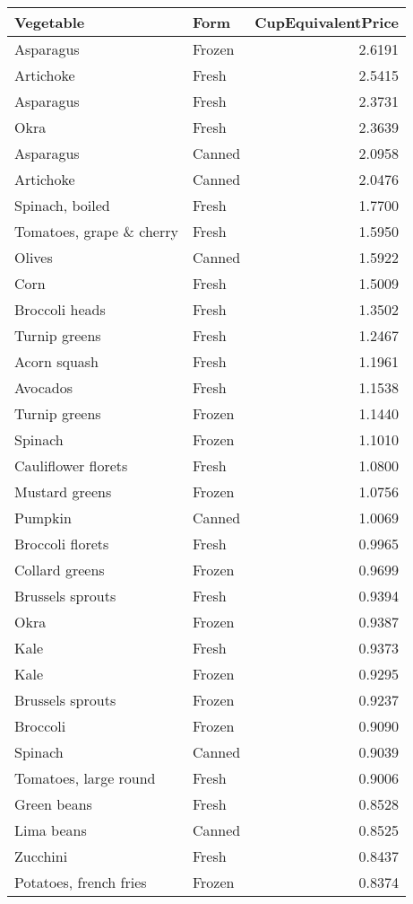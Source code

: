 \documentclass[
]{article}
\begin{document}
\begin{longtable}[t]{llr}
\toprule
Vegetable & Form & CupEquivalentPrice\\
\midrule
Asparagus & Frozen & 2.6191\\
Artichoke & Fresh & 2.5415\\
Asparagus & Fresh & 2.3731\\
Okra & Fresh & 2.3639\\
Asparagus & Canned & 2.0958\\
\addlinespace
Artichoke & Canned & 2.0476\\
Spinach, boiled & Fresh & 1.7700\\
Tomatoes, grape \& cherry & Fresh & 1.5950\\
Olives & Canned & 1.5922\\
Corn & Fresh & 1.5009\\
\addlinespace
Broccoli heads & Fresh & 1.3502\\
Turnip greens & Fresh & 1.2467\\
Acorn squash & Fresh & 1.1961\\
Avocados & Fresh & 1.1538\\
Turnip greens & Frozen & 1.1440\\
\addlinespace
Spinach & Frozen & 1.1010\\
Cauliflower florets & Fresh & 1.0800\\
Mustard greens & Frozen & 1.0756\\
Pumpkin & Canned & 1.0069\\
Broccoli florets & Fresh & 0.9965\\
\addlinespace
Collard greens & Frozen & 0.9699\\
Brussels sprouts & Fresh & 0.9394\\
Okra & Frozen & 0.9387\\
Kale & Fresh & 0.9373\\
Kale & Frozen & 0.9295\\
\addlinespace
Brussels sprouts & Frozen & 0.9237\\
Broccoli & Frozen & 0.9090\\
Spinach & Canned & 0.9039\\
Tomatoes, large round & Fresh & 0.9006\\
Green beans & Fresh & 0.8528\\
\addlinespace
Lima beans & Canned & 0.8525\\
Zucchini & Fresh & 0.8437\\
Potatoes, french fries & Frozen & 0.8374\\

\end{longtable}
\end{document}
